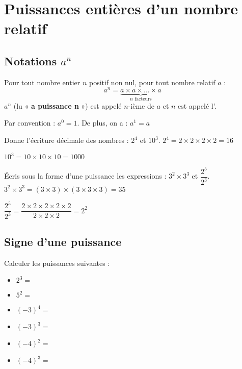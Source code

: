 \section{Puissances entières d'un nombre relatif}

\subsection{Notations $a^n$}

\begin{definition}
Pour tout nombre entier $n$ positif non nul, pour tout nombre relatif $a$ :
\[ a^n = \underbrace{a \times a \times ... \times a}_{\text{$n$ facteurs}} \]
$a^n$ (lu « \textbf{a puissance n} ») est appelé  $n$-ième de $a$ et $n$ est appelé l'.
\end{definition}


\begin{remarque}
Par convention : $a^0=1$. De plus, on a : $a^1=a$
\end{remarque}

\begin{exemple}
Donne l'écriture décimale des nombres : $2^4$ et $10^3$.
\correction
$2^4 = 2 \times 2 \times 2 \times 2 = 16$

$10^3 = 10\times10\times10 = 1 000$
\end{exemple}


\begin{exemple}
Écris sous la forme d'une puissance les expressions : $3^2 \times 3^3$ et $\dfrac{2^5}{2^3}$.
\correction
$3^2 \times 3^3  = (3 \times 3) \times (3 \times 3 \times 3) = 35$

$\dfrac{2^5}{2^3}=\dfrac{2\times2\times2\times2\times2}{2\times2\times2}=2^2$
\end{exemple} 





\subsection{Signe d'une puissance}

\begin{exemple*1}
Calculer les puissances suivantes :
\begin{itemize}
    \item $2^3 =$ 
    \item $5^2 =$ 
    \item $(-3)^4 =$ 
    \item $(-3)^3 =$ 
    \item $(-4)^2 =$ 
    \item $(-4)^3 =$ 
\end{itemize}
\end{exemple*1}

